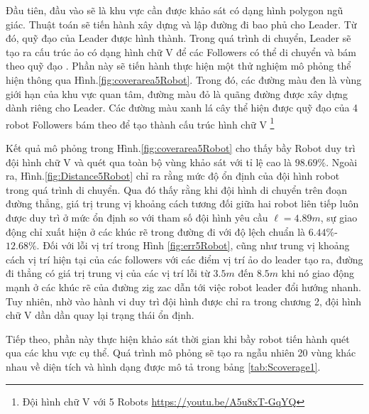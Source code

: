 Đầu tiên, đầu vào sẽ là khu vực cần được khảo sát có dạng hình polygon ngũ giác. Thuật toán sẽ tiến hành xây dựng và lập đường đi bao phủ cho Leader. Từ đó, quỹ đạo của Leader được hình thành. Trong quá trình di chuyển, Leader sẽ tạo ra cấu trúc ảo có dạng hình chữ V để các Followers có thể di chuyển và bám theo quỹ đạo . Phần này sẽ tiến hành thực hiện một thử nghiệm mô phỏng thể hiện thông qua Hình.\ref{fig:coverarea5Robot}. Trong đó, các đường màu đen là vùng giới hạn của khu vực quan tâm, đường màu đỏ là quãng đường được xây dựng dành riêng cho Leader. Các đường màu xanh lá cây thể hiện được quỹ đạo của 4 robot Followers bám theo để tạo thành cấu trúc hình chữ V \footnote{Đội hình chữ V với 5 Robots \url{https://youtu.be/A5u8xT-GqYQ}}


Kết quả mô phỏng trong Hình.\ref{fig:coverarea5Robot} cho thấy bầy Robot duy trì đội hình chữ V và quét qua toàn bộ vùng khảo sát với tỉ lệ cao là $98.69\%$. Ngoài ra, Hình.\ref{fig:Distance5Robot} chỉ ra rằng mức độ ổn định của đội hình robot trong quá trình di chuyển. Qua đó thấy rằng khi đội hình di chuyển trên đoạn đường thẳng, giá trị trung vị khoảng cách tương đối giữa hai robot liên tiếp luôn được duy trì ở mức ổn định so với tham số đội hình yêu cầu $\ell=4.89 m$, sự giao động chỉ xuất hiện ở các khúc rẽ trong đường đi với độ lệch chuẩn là  $6.44\%$-$12.68\%$. Đối với lỗi vị trí trong Hình \ref{fig:err5Robot}, cũng như trung vị khoảng cách vị trí hiện tại của các followers với các điểm vị trí ảo do leader tạo ra, đường đi thẳng có giá trị trung vị của các vị trí lỗi từ $3.5 m$ đến $8.5m $  khi nó giao động mạnh ở các khúc rẽ của đường zig zac dẫn tới việc robot leader đổi hướng nhanh. Tuy nhiên, nhờ vào hành vi duy trì đội hình được chỉ ra trong chương 2, đội hình chữ V dần dần quay lại trạng thái ổn định. 


Tiếp theo, phần này thực hiện khảo sát thời gian khi bầy robot tiến hành quét qua các khu vực cụ thể. Quá trình mô phỏng sẽ tạo ra ngẫu nhiên 20 vùng khác nhau về diện tích và hình dạng được mô tả trong bảng \ref{tab:Scoverage1}.

